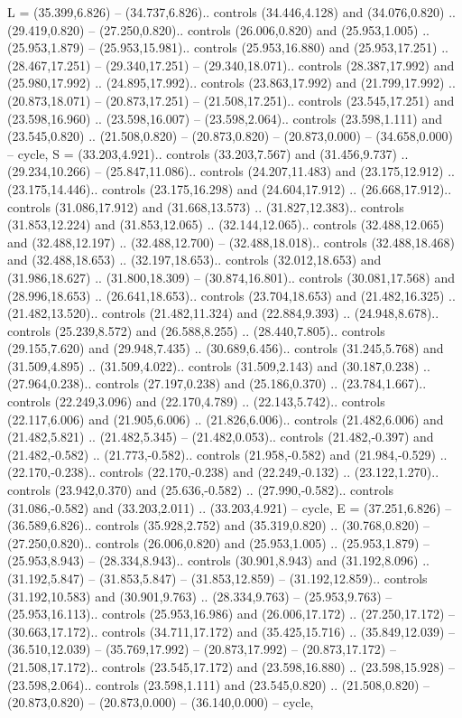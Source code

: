{L} = {(35.399,6.826) -- (34.737,6.826).. controls (34.446,4.128) and (34.076,0.820) .. (29.419,0.820) -- (27.250,0.820).. controls (26.006,0.820) and (25.953,1.005) .. (25.953,1.879) -- (25.953,15.981).. controls (25.953,16.880) and (25.953,17.251) .. (28.467,17.251) -- (29.340,17.251) -- (29.340,18.071).. controls (28.387,17.992) and (25.980,17.992) .. (24.895,17.992).. controls (23.863,17.992) and (21.799,17.992) .. (20.873,18.071) -- (20.873,17.251) -- (21.508,17.251).. controls (23.545,17.251) and (23.598,16.960) .. (23.598,16.007) -- (23.598,2.064).. controls (23.598,1.111) and (23.545,0.820) .. (21.508,0.820) -- (20.873,0.820) -- (20.873,0.000) -- (34.658,0.000) -- cycle},
{S} = {(33.203,4.921).. controls (33.203,7.567) and (31.456,9.737) .. (29.234,10.266) -- (25.847,11.086).. controls (24.207,11.483) and (23.175,12.912) .. (23.175,14.446).. controls (23.175,16.298) and (24.604,17.912) .. (26.668,17.912).. controls (31.086,17.912) and (31.668,13.573) .. (31.827,12.383).. controls (31.853,12.224) and (31.853,12.065) .. (32.144,12.065).. controls (32.488,12.065) and (32.488,12.197) .. (32.488,12.700) -- (32.488,18.018).. controls (32.488,18.468) and (32.488,18.653) .. (32.197,18.653).. controls (32.012,18.653) and (31.986,18.627) .. (31.800,18.309) -- (30.874,16.801).. controls (30.081,17.568) and (28.996,18.653) .. (26.641,18.653).. controls (23.704,18.653) and (21.482,16.325) .. (21.482,13.520).. controls (21.482,11.324) and (22.884,9.393) .. (24.948,8.678).. controls (25.239,8.572) and (26.588,8.255) .. (28.440,7.805).. controls (29.155,7.620) and (29.948,7.435) .. (30.689,6.456).. controls (31.245,5.768) and (31.509,4.895) .. (31.509,4.022).. controls (31.509,2.143) and (30.187,0.238) .. (27.964,0.238).. controls (27.197,0.238) and (25.186,0.370) .. (23.784,1.667).. controls (22.249,3.096) and (22.170,4.789) .. (22.143,5.742).. controls (22.117,6.006) and (21.905,6.006) .. (21.826,6.006).. controls (21.482,6.006) and (21.482,5.821) .. (21.482,5.345) -- (21.482,0.053).. controls (21.482,-0.397) and (21.482,-0.582) .. (21.773,-0.582).. controls (21.958,-0.582) and (21.984,-0.529) .. (22.170,-0.238).. controls (22.170,-0.238) and (22.249,-0.132) .. (23.122,1.270).. controls (23.942,0.370) and (25.636,-0.582) .. (27.990,-0.582).. controls (31.086,-0.582) and (33.203,2.011) .. (33.203,4.921) -- cycle},
{E} = {(37.251,6.826) -- (36.589,6.826).. controls (35.928,2.752) and (35.319,0.820) .. (30.768,0.820) -- (27.250,0.820).. controls (26.006,0.820) and (25.953,1.005) .. (25.953,1.879) -- (25.953,8.943) -- (28.334,8.943).. controls (30.901,8.943) and (31.192,8.096) .. (31.192,5.847) -- (31.853,5.847) -- (31.853,12.859) -- (31.192,12.859).. controls (31.192,10.583) and (30.901,9.763) .. (28.334,9.763) -- (25.953,9.763) -- (25.953,16.113).. controls (25.953,16.986) and (26.006,17.172) .. (27.250,17.172) -- (30.663,17.172).. controls (34.711,17.172) and (35.425,15.716) .. (35.849,12.039) -- (36.510,12.039) -- (35.769,17.992) -- (20.873,17.992) -- (20.873,17.172) -- (21.508,17.172).. controls (23.545,17.172) and (23.598,16.880) .. (23.598,15.928) -- (23.598,2.064).. controls (23.598,1.111) and (23.545,0.820) .. (21.508,0.820) -- (20.873,0.820) -- (20.873,0.000) -- (36.140,0.000) -- cycle},
